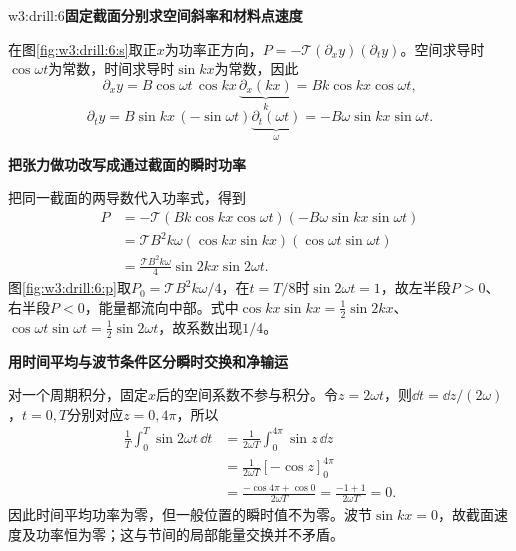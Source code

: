 \begin{drillsolution}{w3:drill:6}\textbf{固定截面分别求空间斜率和材料点速度}\par\nobreak
在图\ref{fig:w3:drill:6:s}取正$x$为功率正方向，$P=-\mathcal T(\partial_xy)(\partial_ty)$。空间求导时$\cos\omega t$为常数，时间求导时$\sin kx$为常数，因此
\[
\partial_xy=B\cos\omega t\,\cos kx\,\underbrace{\partial_x(kx)}_{k}
=Bk\cos kx\cos\omega t,
\]
\[
\partial_ty=B\sin kx\,(-\sin\omega t)\underbrace{\partial_t(\omega t)}_{\omega}
=-B\omega\sin kx\sin\omega t.
\]



\par\medskip{}\noindent\textbf{把张力做功改写成通过截面的瞬时功率}\par\nobreak
把同一截面的两导数代入功率式，得到
\[
\begin{aligned}
P&=-\mathcal T(Bk\cos kx\cos\omega t)
(-B\omega\sin kx\sin\omega t)\\
&=\mathcal T B^2k\omega(\cos kx\sin kx)
(\cos\omega t\sin\omega t)\\
&=\frac{\mathcal T B^2k\omega}{4}\sin2kx\sin2\omega t.
\end{aligned}
\]
图\ref{fig:w3:drill:6:p}取$P_0=\mathcal T B^2k\omega/4$，在$t=T/8$时$\sin2\omega t=1$，故左半段$P>0$、右半段$P<0$，能量都流向中部。式中$\cos kx\sin kx=\tfrac12\sin2kx$、$\cos\omega t\sin\omega t=\tfrac12\sin2\omega t$，故系数出现$1/4$。

\par\medskip{}\noindent\textbf{用时间平均与波节条件区分瞬时交换和净输运}\par\nobreak
对一个周期积分，固定$x$后的空间系数不参与积分。令$z=2\omega t$，则$\dd t=\dd z/(2\omega)$，$t=0,T$分别对应$z=0,4\pi$，所以
\[
\begin{aligned}
\frac1T\int_0^T\sin2\omega t\,\dd t
&=\frac1{2\omega T}\int_0^{4\pi}\sin z\,\dd z\\
&=\frac1{2\omega T}[-\cos z]_0^{4\pi}\\
&=\frac{-\cos4\pi+\cos0}{2\omega T}
=\frac{-1+1}{2\omega T}=0.
\end{aligned}
\]
因此时间平均功率为零，但一般位置的瞬时值不为零。波节$\sin kx=0$，故截面速度及功率恒为零；这与节间的局部能量交换并不矛盾。\end{drillsolution}
